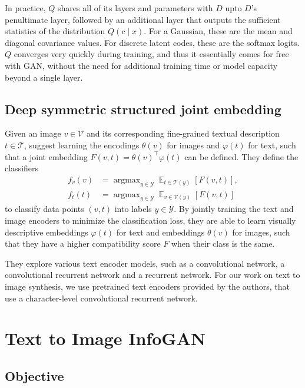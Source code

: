 \documentclass{article}
\DeclareMathOperator*{\argmax}{\arg\max}
\DeclareMathOperator*{\E}{\mathbb{E}}
\begin{document}
In practice, $Q$ shares all of its layers and parameters with $D$ upto $D$'s
penultimate layer, followed by an additional layer that outputs the sufficient statistics of the distribution $Q(c\mid x)$. For a Gaussian, these are the mean and diagonal covariance values. For discrete latent codes, these are the softmax logits. $Q$ converges very quickly during training, and thus it essentially comes for free with GAN, without the need for additional training time or model capacity beyond a single layer.


\subsection{Deep symmetric structured joint embedding}

Given an image $v\in\mathcal{V}$ and its corresponding fine-grained textual description $t\in\mathcal{T}$, \cite{visualdesc} suggest learning the encodings $\theta(v)$ for images and $\varphi(t)$ for text, such that a joint embedding $F(v,t)=\theta(v)^\top \varphi(t)$ can be defined. They define the classifiers
\begin{align}
f_v(v) &= \argmax_{y\in\mathcal{Y}} \E_{t\in\mathcal{T}(y)}\left[F(v,t)\right],\\
f_t(t) &= \argmax_{y\in\mathcal{Y}} \E_{v\in\mathcal{V}(y)}\left[F(v,t)\right]
\end{align}
to classify data points $(v,t)$ into labels $y\in\mathcal{Y}$. By jointly training the text and image encoders to minimize the classification loss, they are able to learn visually descriptive embeddings $\varphi(t)$ for text and embeddings $\theta(v)$ for images, such that they have a higher compatibility score $F$ when their class is the same.

They explore various text encoder models, such as a convolutional network, a convolutional recurrent network and a recurrent network. For our work on text to image synthesis, we use pretrained text encoders provided by the authors, that use a character-level convolutional recurrent network.


\section{Text to Image InfoGAN}

\subsection{Objective}
\end{document}
